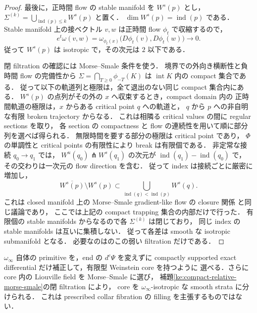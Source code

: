 \begin{proof}
最後に，正時間 flow の stable manifold を $W^s(p)$ とし，
$\Sigma^{(k)}=\bigcup_{\operatorname{ind}(p)\le k}W^s(p)$ と置く．
$\dim W^s(p)=\operatorname{ind}(p)$ である．
Stable manifold 上の接ベクトル $v,w$ は正時間 flow $\phi_t$ で収縮するので，
\[
 e^t\omega(v,w)=
 \omega_{\phi_t(x)}\bigl(D\phi_t(v),D\phi_t(w)\bigr)\longrightarrow0.
\]
従って $W^s(p)$ は isotropic で，その次元は $2$ 以下である．

閉 filtration の確認には Morse--Smale 条件を使う．
境界での外向き横断性と負時間 flow の完備性から
$\Sigma=\bigcap_{T\ge0}\phi_{-T}(K)$ は $\operatorname{int}K$ 内の compact 集合である．
従って以下の軌道列と極限は，全て退出のない同じ compact 集合内にある．
$W^s(p)$ の点列がその外の $x$ へ収束するとき，compact domain 内の
正時間軌道の極限は，$x$ からある critical point $q$ への軌道と，
$q$ から $p$ への非自明な有限 broken trajectory からなる．
これは相隣る critical values の間に regular sections を取り，
各 section の compactness と flow の連続性を用いて順に部分列を選べば得られる．
無限時間を要する部分の極限は critical point であり，
$\Phi$ の単調性と critical points の有限性により break は有限個である．
非定常な接続 $q_0\to q_1$ では，
$W^u(q_0)\pitchfork W^s(q_1)$ の次元が
$\operatorname{ind}(q_1)-\operatorname{ind}(q_0)$ で，
その交わりは一次元の flow direction を含む．
従って index は接続ごとに厳密に増加し，
\[
 \overline{W^s(p)}\setminus W^s(p)
 \subset\bigcup_{\operatorname{ind}(q)<\operatorname{ind}(p)}W^s(q).
\]
これは closed manifold 上の Morse--Smale gradient-like flow の closure 関係
\cite[Introduction]{AbbondandoloMajerMS}と同じ議論であり，
ここでは上記の compact trapping 集合の内部だけで行った．
有限個の stable manifolds からなるので各 $\Sigma^{(k)}$ は閉じており，
同じ index の stable manifolds は互いに集積しない．
従って各差は smooth な isotropic submanifold となる．
必要なのは\cite[Definition~2.1]{EM}のこの弱い filtration だけである．
\end{proof}

\begin{corollary}
\label{ke:actual-limit-weinstein-core}
$\omega_\infty$ 自体の primitive を，end の $d^c\Psi$ を変えずに
compactly supported exact differential だけ補正して，有限型 Weinstein core を持つように
選べる．さらに core 内の Liouville field を Morse--Smale に選び，
補題\ref{ke:compact-relative-morse-smale}の閉 filtration により，
core を $\omega_\infty$-isotropic な smooth strata に分けられる．
これは prescribed collar fibration の filling を主張するものではない．
\end{corollary}

